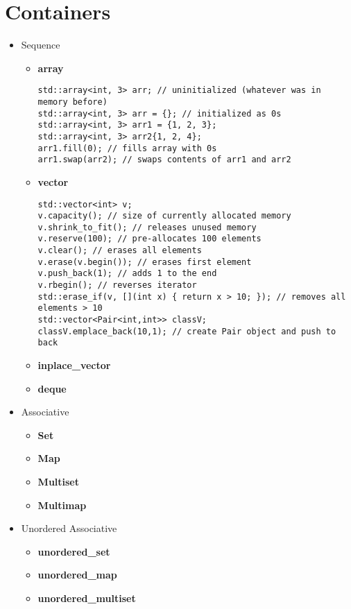 \documentclass{article}
\begin{document}
\section{Containers}
    \begin{itemize}
      \item Sequence
        \begin{itemize}
          \item \textbf{array}
            \begin{lstlisting}[style=cpp]
std::array<int, 3> arr; // uninitialized (whatever was in memory before)
std::array<int, 3> arr = {}; // initialized as 0s
std::array<int, 3> arr1 = {1, 2, 3};
std::array<int, 3> arr2{1, 2, 4};
arr1.fill(0); // fills array with 0s
arr1.swap(arr2); // swaps contents of arr1 and arr2
      \end{lstlisting}
          \item \textbf{vector}
            \begin{lstlisting}[style=cpp]
std::vector<int> v;
v.capacity(); // size of currently allocated memory
v.shrink_to_fit(); // releases unused memory
v.reserve(100); // pre-allocates 100 elements
v.clear(); // erases all elements
v.erase(v.begin()); // erases first element
v.push_back(1); // adds 1 to the end
v.rbegin(); // reverses iterator
std::erase_if(v, [](int x) { return x > 10; }); // removes all elements > 10
std::vector<Pair<int,int>> classV;
classV.emplace_back(10,1); // create Pair object and push to back
         \end{lstlisting}
          \item \textbf{inplace\_vector}
          \item \textbf{deque}
        \end{itemize}
      \item Associative
        \begin{itemize}
          \item \textbf{Set}
          \item \textbf{Map}
          \item \textbf{Multiset}
          \item \textbf{Multimap}
        \end{itemize}
      \item Unordered Associative
        \begin{itemize}
          \item \textbf{unordered\_set}
          \item \textbf{unordered\_map}
          \item \textbf{unordered\_multiset}

\end{itemize}
\end{itemize}
\end{document}

